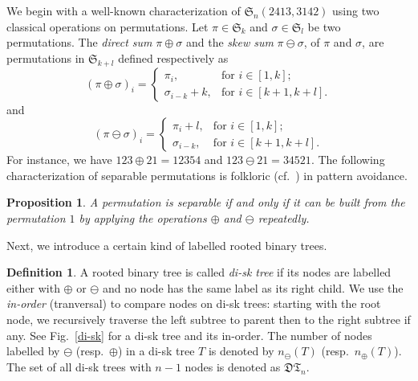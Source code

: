 \documentclass[12pt]{amsart}
\numberwithin{equation}{section}
\theoremstyle{plain}
\newtheorem{proposition}[theorem]{Proposition}
\theoremstyle{definition}
\newtheorem{Def}[theorem]{Definition}
\def\S{\mathfrak{S}}
\def\D{\mathfrak{D}}
\def\T{\mathfrak{T}}
\begin{document}
We begin with a well-known characterization of $\S_n(2413,3142)$ using two classical operations on permutations. Let   $\pi\in\S_k$ and $\sigma\in\S_l$ be two permutations. 
The \emph{direct sum} $\pi\oplus\sigma$ and the \emph{skew sum} $\pi\ominus\sigma$, of $\pi$ and $\sigma$, are permutations in $\S_{k+l}$ defined respectively as
$$
(\pi\oplus\sigma)_i=
\begin{cases}
\pi_i, &\text{for $i\in[1,k]$};\\
\sigma_{i-k}+k, &\text{for $i\in[k+1,k+l]$}.
\end{cases}
$$
and
$$
(\pi\ominus\sigma)_i=
\begin{cases}
\pi_i+l, &\text{for $i\in[1,k]$};\\
\sigma_{i-k}, &\text{for $i\in[k+1,k+l]$}.
\end{cases}
$$
 For instance, we have $123\oplus 21=12354$ and $123\ominus 21=34521$. The following  characterization of separable permutations is  folkloric  (cf.~\cite[page 57]{ki}) in pattern avoidance. 

 

 
 \begin{proposition}\label{desides}
 A permutation is separable if and only if it can be built from the permutation $1$ by applying the operations $\oplus$ and $\ominus$ repeatedly. 
 \end{proposition}
 



Next, we introduce a certain kind of labelled rooted binary trees. 
\begin{Def}\label{diskorder}
A  rooted  binary tree is called   \emph{di-sk tree} if its nodes are labelled either with  $\oplus$ or $\ominus$ and no node has the same label as its right child.  We use  the \emph{in-order} (tranversal) to compare nodes on di-sk trees:  starting with the root node, we recursively traverse the left subtree to parent then to the right subtree if any. See Fig.~\ref{di-sk} for a di-sk tree and its in-order.
The number of nodes labelled by $\ominus$ (resp.~$\oplus$)  in a di-sk tree $T$  is denoted by $n_\ominus(T)$ (resp.~$n_\oplus(T)$). The set of all di-sk trees with $n-1$ nodes is denoted as $\D\T_n$. 
\end{Def}
\end{document}

